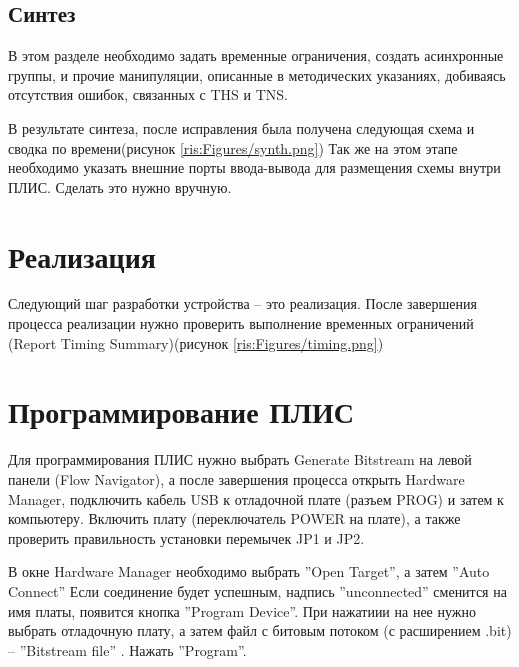 \begin{sloppypar}
\subsection{Синтез} %
В этом разделе необходимо задать временные ограничения, создать асинхронные группы, и прочие манипуляции, описанные в методических указаниях, добиваясь отсутствия ошибок, связанных с THS  и TNS. 

В результате синтеза, после исправления была получена следующая схема и сводка по времени(рисунок \ref{ris:Figures/synth.png})
Так же на этом этапе необходимо указать внешние порты ввода-вывода для размещения схемы внутри ПЛИС. Сделать это нужно вручную.

\begin{landscape}
\end{landscape}



\section{Реализация} %
Следующий шаг разработки устройства – это реализация.
После завершения процесса реализации нужно проверить выполнение временных ограничений (Report Timing Summary)(рисунок \ref{ris:Figures/timing.png})
\section{Программирование ПЛИС} %

Для программирования ПЛИС нужно выбрать Generate Bitstream на левой панели (Flow Navigator), а после завершения процесса открыть Hardware Manager, подключить кабель USB к отладочной плате (разъем PROG) и затем к компьютеру. Включить плату (переключатель POWER на плате), а также проверить правильность установки перемычек JP1 и JP2. 

 
В окне Hardware Manager необходимо выбрать ''Open Target'', а затем ''Auto Connect'' Если соединение будет успешным, надпись ''unconnected'' сменится на имя платы, появится кнопка ''Program Device''. При нажатиии на нее нужно выбрать отладочную плату, а затем файл с битовым потоком (с расширением
.bit) -- ''Bitstream file'' . Нажать ''Program''.


\end{sloppypar}
